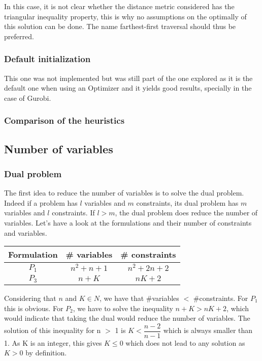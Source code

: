\documentclass[a4paper,10pt]{article}
\begin{document}
In this case, it is not clear whether the distance metric considered has the triangular inequality property, this is why no assumptions on the optimally of this solution can be done. The name farthest-first traversal should thus be preferred. 


\subsubsection{Default initialization}
This one was not implemented but was still part of the one explored as it is the default one when using an Optimizer and it yields good results, specially in the case of Gurobi.

\subsubsection{Comparison of the heuristics}


\subsection{Number of variables}

\subsubsection{Dual problem}
The first idea to reduce the number of variables is to solve the dual problem. Indeed if a problem has $l$ variables and $m$ constraints, its dual problem has $m$ variables and $l$ constraints. If $l > m$, the dual problem does reduce the number of variables. Let's have a look at the formulations and their number of constraints and variables.

\begin{table}[h!]
\centering
\begin{tabular}{c|c|c}
    Formulation & \# variables & \# constraints \\
    \hline
    $P_1$ & $n^2 + n + 1$ & $n^2 + 2n + 2$ \\
    $P_3$ & $n + K$ & $nK+2$
\end{tabular}
\end{table}

Considering that $n$ and $K \in N$, we have that \#variables $<$ \#constraints. For $P_1$ this is obvious. For $P_2$, we have to solve the inequality $n + K > nK + 2$, which would indicate that taking the dual would reduce the number of variables. The solution of this inequality for n $>$ 1 is $K < \dfrac{n-2}{n-1}$ which is always smaller than 1. As K is an integer, this gives $K \leq 0$ which does not lead to any solution as $K > 0$ by definition. 
\end{document}
